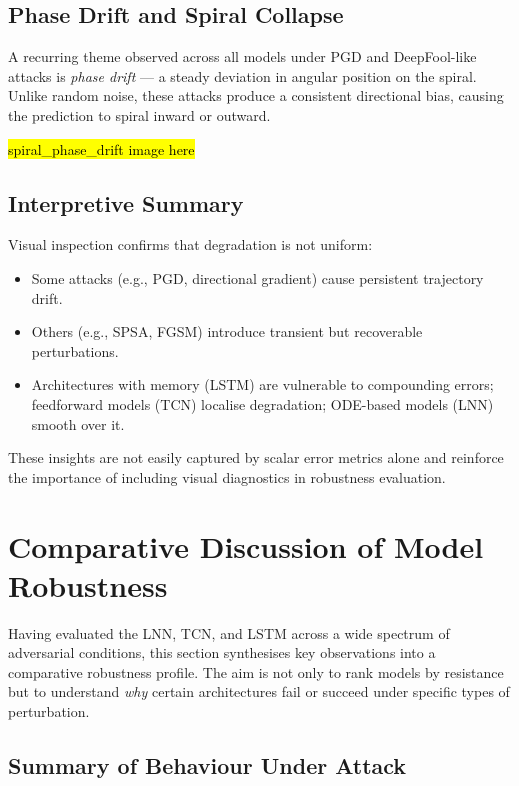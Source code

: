 \subsection*{Phase Drift and Spiral Collapse}

A recurring theme observed across all models under PGD and DeepFool-like attacks is \emph{phase drift} — a steady deviation in angular position on the spiral. Unlike random noise, these attacks produce a consistent directional bias, causing the prediction to spiral inward or outward.

\hl{spiral\_phase\_drift image here}

\subsection*{Interpretive Summary}

Visual inspection confirms that degradation is not uniform:
\begin{itemize}
    \item Some attacks (e.g., PGD, directional gradient) cause persistent trajectory drift.
    \item Others (e.g., SPSA, FGSM) introduce transient but recoverable perturbations.
    \item Architectures with memory (LSTM) are vulnerable to compounding errors; feedforward models (TCN) localise degradation; ODE-based models (LNN) smooth over it.
\end{itemize}

These insights are not easily captured by scalar error metrics alone and reinforce the importance of including visual diagnostics in robustness evaluation.

\section{Comparative Discussion of Model Robustness}

Having evaluated the LNN, TCN, and LSTM across a wide spectrum of adversarial conditions, this section synthesises key observations into a comparative robustness profile. The aim is not only to rank models by resistance but to understand \emph{why} certain architectures fail or succeed under specific types of perturbation.

\subsection{Summary of Behaviour Under Attack}

